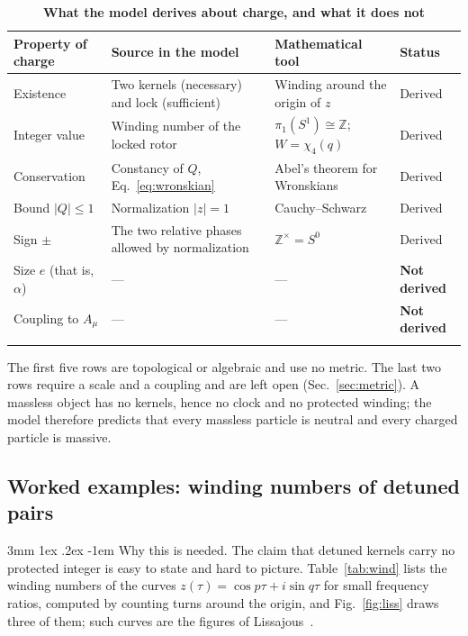 \documentclass[%
 reprint, amsmath,amssymb, aps, prb, ]{revtex4-2}
\makeatletter
\numberwithin{equation}{section}
\renewcommand\paragraph{%
  \@startsection{paragraph}{4}{\z@}%
    {3mm \@plus 1ex \@minus .2ex}%
    {-1em}%
    {\normalfont\normalsize\itshape}}
\makeatother
\begin{document}
\begin{table}[t!]
\centering
\caption{\textbf{What the model derives about charge, and what it does not}}
\label{tab:charge}
\renewcommand{\arraystretch}{1.4}
\begin{tabular}{p{3.2cm}p{4.6cm}p{4.2cm}p{3.5cm}}
\toprule
\textbf{Property of charge} & \textbf{Source in the model} & \textbf{Mathematical tool} & \textbf{Status} \\
\midrule
Existence
& Two kernels (necessary) and lock (sufficient)
& Winding around the origin of $z$
& Derived \\
\addlinespace[0.3cm]
Integer value
& Winding number of the locked rotor
& $\pi_1(S^1)\cong\mathbb{Z}$; $W=\chi_4(q)$
& Derived \\
\addlinespace[0.3cm]
Conservation
& Constancy of $Q$, Eq.~\eqref{eq:wronskian}
& Abel's theorem for Wronskians~\cite{ref:coddington}
& Derived \\
\addlinespace[0.3cm]
Bound $|Q|\le1$
& Normalization $|z|=1$
& Cauchy--Schwarz
& Derived \\
\addlinespace[0.3cm]
Sign $\pm$
& The two relative phases allowed by normalization
& $\mathbb{Z}^\times=S^0$
& Derived \\
\addlinespace[0.3cm]
Size $e$ (that is, $\alpha$)
& ---
& ---
& \textbf{Not derived} \\
\addlinespace[0.3cm]
Coupling to $A_\mu$
& ---
& ---
& \textbf{Not derived} \\
\addlinespace[0.2cm]
\bottomrule
\end{tabular}
\vspace{0.2cm}
\begin{minipage}{0.95\textwidth}
\justifying\footnotesize
The first five rows are topological or algebraic and use no metric. The last two rows require a scale and a coupling and are left open (Sec.~\ref{sec:metric}). A massless object has no kernels, hence no clock and no protected winding; the model therefore predicts that every massless particle is neutral and every charged particle is massive.
\end{minipage}
\end{table}

\subsection{Worked examples: winding numbers of detuned pairs}

\paragraph{Why this is needed.} The claim that detuned kernels carry no protected integer is easy to state and hard to picture. Table~\ref{tab:wind} lists the winding numbers of the curves $z(\tau)=\cos p\tau+i\sin q\tau$ for small frequency ratios, computed by counting turns around the origin, and Fig.~\ref{fig:liss} draws three of them; such curves are the figures of Lissajous~\cite{ref:lissajous}.
\end{document}
